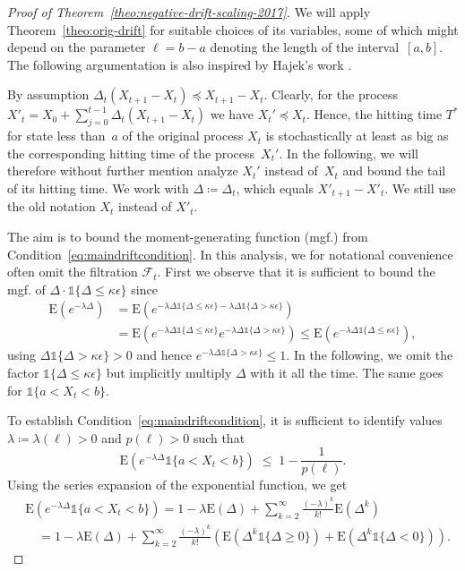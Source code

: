 \documentclass[11pt, a4paper]{article}
\newcommand*{\E}{\mathrm{E}}
\newcommand{\indic}[1]{\mathds{1}\{#1\}}
\newcommand{\filtt}{\mathcal{F}_t}
\begin{document}
\begin{proof}[Proof of {Theorem~\ref{theo:negative-drift-scaling-2017}}]
  We will apply Theorem~\ref{theo:orig-drift} for suitable choices of
  its variables, some of which might depend on the parameter
  $\ell=b-a$ denoting the length of the interval~$[a,b]$.
  The following argumentation is
  also inspired by Hajek's work \citep{Hajek1982}.
	

	By assumption $\Delta_t(X_{t+1}-X_t)\preceq X_{t+1}-X_t$. Clearly, 
	for the process $X'_t=X_0+\sum_{j=0}^{t-1} \Delta_t(X_{t+1}-X_t)$ 
	we have $X_t'\preceq X_t$. Hence, the hitting time $T^*$ for 
	state less than~$a$ of the original 
	process $X_t$ is stochastically 
	at least as big as the corresponding hitting time of the process~$X_t'$. In the following, 
	we will therefore without further mention analyze $X_t'$ instead of~$X_t$ and bound the tail of its hitting time. 
	We work with $\Delta\coloneqq \Delta_t$, which equals $X'_{t+1}-X'_t$. We still use the old notation 
	$X_t$ instead of $X'_t$. 
	
	
	The aim is to bound 
	the moment-generating function (mgf.) from 
	 Condition~\eqref{eq:maindriftcondition}. In this analysis,  we for notational convenience often omit 
	the filtration $\filtt$. 
	First we observe that 
	it is sufficient to bound the mgf. of $\Delta\cdot \indic{\Delta\le \kappa\epsilon}$ 
	since 
	\begin{align*}
	\E(e^{-\lambda \Delta}) & = 
	\E(e^{-\lambda \Delta \indic{\Delta\le \kappa\epsilon} - \lambda\Delta \indic{\Delta> \kappa\epsilon}})\\
  & = \E(e^{-\lambda \Delta \indic{\Delta\le \kappa\epsilon}} e^{ - \lambda\Delta \indic{\Delta> \kappa\epsilon}})
  \le 	\E(e^{-\lambda \Delta \indic{\Delta\le \kappa\epsilon}}), 
	\end{align*}
	using $\Delta \indic{\Delta> \kappa\epsilon}>0$ and 
	hence $e^{ - \lambda\Delta \indic{\Delta> \kappa\epsilon}}\le 1$. 
	In the following, we omit the factor $\indic{\Delta\le  \kappa\epsilon}$ 
	but implicitly multiply $\Delta$ with it all the time. The same goes 
	for $\indic{a<X_t<b}$. 
	
	To establish Condition~\eqref{eq:maindriftcondition}, it is sufficient 
  to identify values $\lambda\coloneqq \lambda(\ell)>0$ and $p(\ell)>0$ such
  that
  \[
  \E(e^{-\lambda \Delta}\indic{a<X_t<b})
  \;\le\; 1-\frac{1}{p(\ell)}.
  \]
  Using the series expansion of the exponential function, we get
  \begin{align*}
    & \E(e^{-\lambda \Delta}\indic{a<X_t<b})  = 
		1 - \lambda \E(\Delta) + \sum_{k=2}^\infty  \frac{(-\lambda)^{k}}{k!} \E(\Delta^k)\\ 
    & \quad = 
    1 - \lambda \E(\Delta) + \sum_{k=2}^\infty  \frac{(-\lambda)^{k}}{k!} \left(\E(\Delta^k\indic{\Delta\ge 0}) + 
		\E(\Delta^k\indic{\Delta< 0})\right). 
		\end{align*}
		

\end{proof}
\end{document}
